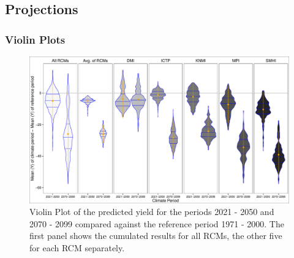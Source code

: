 \documentclass[12pt]{iopart}
\begin{document}



\subsection{Projections}

\subsubsection{Violin Plots}
\begin{figure}
	\label{violin:1f}
	\centering
	\includegraphics[width=1\textwidth]{figures/ViolinPlot_meanMinusMean.pdf}
	\caption{Violin Plot of the predicted yield for the periods 2021 - 2050 and 2070 - 2099 compared against the reference period 1971 - 2000. The first panel shows the cumulated results for all RCMs, the other five for each RCM separately.}
\end{figure}
\end{document}
